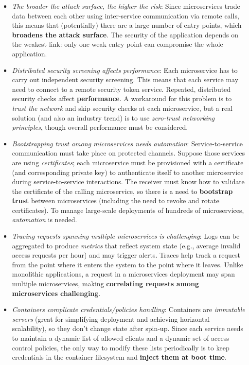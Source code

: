 \begin{itemize}
    \item \textit{The broader the attack surface, the higher the risk}: Since microservices trade data between each other using inter-service communication via remote calls, this means that (potentially) there are a large number of entry points, which \textbf{broadens the attack surface}. The security of the application depends on the weakest link: only one weak entry point can compromise the whole application.
    \item \textit{Distributed security screening affects performance}: Each microservice has to carry out independent security screening. This means that each service may need to connect to a remote security token service. Repeated, distributed security checks affect \textbf{performance}. A workaround for this problem is to \textit{trust the network} and skip security checks at each microservice, but a real solution (and also an industry trend) is to use \textit{zero-trust networking principles}, though overall performance must be considered.
    \newpage
    \item \textit{Bootstrapping trust among microservices needs automation}: Service-to-service communication must take place on protected channels. Suppose those services are using \textit{certificates}; each microservice must be provisioned with a certificate (and corresponding private key) to authenticate itself to another microservice during service-to-service interactions. The receiver must know how to validate the certificate of the calling microservice, so there is a need to \textbf{bootstrap trust} between microservices (including the need to revoke and rotate certificates). To manage large-scale deployments of hundreds of microservices, \textit{automation} is needed.
    \item \textit{Tracing requests spanning multiple microservices is challenging}: Logs can be aggregated to produce \textit{metrics} that reflect system state (e.g., average invalid access requests per hour) and may trigger alerts. Traces help track a request from the point where it enters the system to the point where it leaves. Unlike monolithic applications, a request in a microservices deployment may span multiple microservices, making \textbf{correlating requests among microservices challenging}.
    \item \textit{Containers complicate credentials/policies handling}: Containers are \textit{immutable servers} (great for simplifying deployment and achieving horizontal scalability), so they don’t change state after spin-up. Since each service needs to maintain a dynamic list of allowed clients and a dynamic set of access-control policies, the only way to modify these lists periodically is to keep credentials in the container filesystem and \textbf{inject them at boot time}.

\end{itemize}
